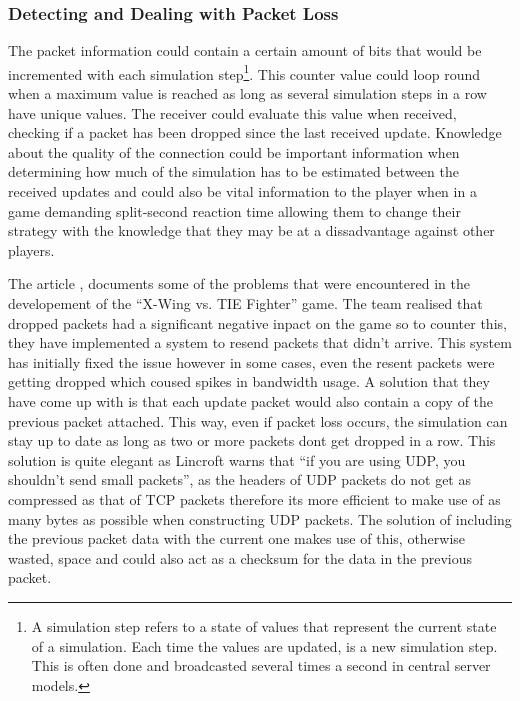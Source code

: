 \subsubsection{Detecting and Dealing with Packet Loss}
The packet information could contain a certain amount of bits that would be incremented with each simulation step\footnote{A simulation step refers to a state of values that represent the current state of a simulation. Each time the values are updated, is a new simulation step. This is often done and broadcasted several times a second in central server models.}. This counter value could loop round when a maximum value is reached as long as several simulation steps in a row have unique values. The receiver could evaluate this value when received, checking if a packet has been dropped since the last received update. Knowledge about the quality of the connection could be important information when determining how much of the simulation has to be estimated between the received updates and could also be vital information to the player when in a game demanding split-second reaction time allowing them to change their strategy with the knowledge that they may be at a dissadvantage against other players.

The article , documents some of the problems that were encountered in the developement of the ``X-Wing vs. TIE Fighter'' game. The team realised that dropped packets had a significant negative inpact on the game so to counter this, they have implemented a system to resend packets that didn't arrive. This system has initially fixed the issue however in some cases, even the resent packets were getting dropped which coused spikes in bandwidth usage. A solution that they have come up with is that each update packet would also contain a copy of the previous packet attached. This way, even if packet loss occurs, the simulation can stay up to date as long as two or more packets dont get dropped in a row. This solution is quite elegant as Lincroft warns that ``if you are using UDP, you shouldn’t send small packets'', as the headers of UDP packets do not get as compressed as that of TCP packets therefore its more efficient to make use of as many bytes as possible when constructing UDP packets. The solution of including the previous packet data with the current one makes use of this, otherwise wasted, space and could also act as a checksum for the data in the previous packet.

\newpage

